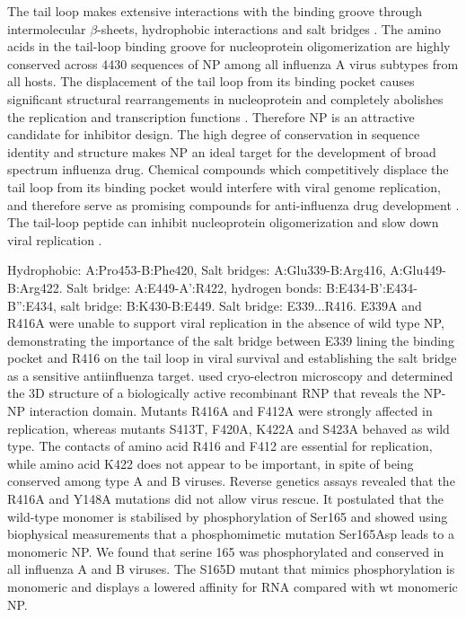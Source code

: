 The tail loop makes extensive interactions with the binding groove through intermolecular $\beta$-sheets, hydrophobic interactions and salt bridges \citep{1140}. The amino acids in the tail-loop binding groove for nucleoprotein oligomerization are highly conserved across 4430 sequences of NP among all influenza A virus subtypes from all hosts. The displacement of the tail loop from its binding pocket causes significant structural rearrangements in nucleoprotein and completely abolishes the replication and transcription functions \citep{1231}. Therefore NP is an attractive candidate for inhibitor design. The high degree of conservation in sequence identity and structure makes NP an ideal target for the development of broad spectrum influenza drug. Chemical compounds which competitively displace the tail loop from its binding pocket would interfere with viral genome replication, and therefore serve as promising compounds for anti-influenza drug development \citep{1140,1231,1232}. The tail-loop peptide can inhibit nucleoprotein oligomerization and slow down viral replication \citep{1233}. 


\citep{1140} Hydrophobic: A:Pro453-B:Phe420, Salt bridges: A:Glu339-B:Arg416, A:Glu449-B:Arg422.
\citep{1231} Salt bridge: A:E449-A':R422, hydrogen bonds: B:E434-B':E434-B'':E434, salt bridge: B:K430-B:E449.
\citep{1233} Salt bridge: E339...R416. E339A and R416A were unable to support viral replication in the absence of wild type NP, demonstrating the importance of the salt bridge between E339 lining the binding pocket and R416 on the tail loop in viral survival and establishing the salt bridge as a sensitive antiinfluenza target.
\citep{1447} used cryo-electron microscopy and determined the 3D structure of a biologically active recombinant RNP that reveals the NP-NP interaction domain. Mutants R416A and F412A were strongly affected in replication, whereas mutants S413T, F420A, K422A and S423A behaved as wild type. The contacts of amino acid R416 and F412 are essential for replication, while amino acid K422 does not appear to be important, in spite of being conserved among type A and B viruses.
\citep{1574} Reverse genetics assays revealed that the R416A and Y148A mutations did not allow virus rescue.%
\citep{1573} It postulated that the wild-type monomer is stabilised by phosphorylation of Ser165 and showed using biophysical measurements that a phosphomimetic mutation Ser165Asp leads to a monomeric NP. We found that serine 165 was phosphorylated and conserved in all influenza A and B viruses. The S165D mutant that mimics phosphorylation is monomeric and displays a lowered affinity for RNA compared with wt monomeric NP.%

